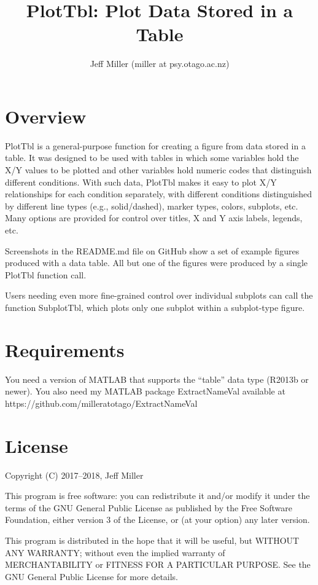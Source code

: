 \documentclass{article}
\title{PlotTbl: Plot Data Stored in a Table}
\author{Jeff Miller (miller at psy.otago.ac.nz)}
\begin{document}
\maketitle
\tableofcontents

\section{Overview}

PlotTbl is a general-purpose function for creating a figure from data stored in a table.
It was designed to be used with tables in which some variables hold the X/Y values to be plotted and
other variables hold numeric codes that distinguish different conditions.
With such data, PlotTbl makes it easy to plot X/Y relationships for each condition
separately, with different conditions distinguished by
different line types (e.g., solid/dashed), marker types, colors, subplots, etc.
Many options are provided for control over titles, X and Y axis labels, legends, etc.

Screenshots in the README.md file on GitHub show a set of example figures produced with a data table.
All but one of the figures were produced by a single PlotTbl function call.

Users needing even more fine-grained control over individual subplots can call the
function SubplotTbl, which plots only one subplot within a subplot-type figure.

\section{Requirements}

You need a version of MATLAB that supports the ``table'' data type (R2013b or newer).
You also need my MATLAB package ExtractNameVal available at
https://github.com/milleratotago/ExtractNameVal


\section{License}

Copyright (C) 2017--2018, Jeff Miller

This program is free software: you can redistribute it and/or modify
it under the terms of the GNU General Public License as published by
the Free Software Foundation, either version 3 of the License, or
(at your option) any later version.

This program is distributed in the hope that it will be useful,
but WITHOUT ANY WARRANTY; without even the implied warranty of
MERCHANTABILITY or FITNESS FOR A PARTICULAR PURPOSE.  See the
GNU General Public License for more details.
\end{document}
